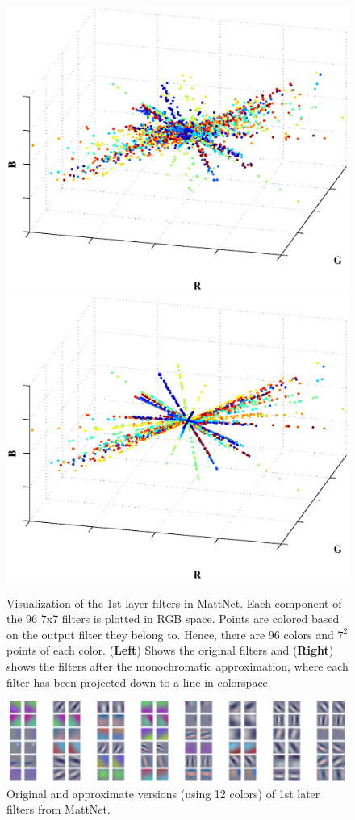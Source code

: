 \begin{figure}[t]
\centering
\begin{minipage}{0.75\textwidth}
	\includegraphics[width=0.5\linewidth]{img/RGB_components_matthew_3d.eps}
	\quad\quad
	\includegraphics[width=0.5\linewidth]{img/monochromatic_RGB_components_matthew_3d.eps} 
\end{minipage}
\vspace{-3mm}
\label{fig:RGB_components}
\caption{Visualization of the 1st layer filters in MattNet. Each component of the 96 7x7 filters is plotted in RGB space. Points are colored based on the output filter they belong to. Hence, there are 96 colors and $7^2$ points of each color. ({\bf Left}) Shows the
  original filters and ({\bf Right}) shows the filters after the monochromatic approximation, where each filter has been projected down to a line in colorspace.}
\end{figure}



\begin{figure}[t]
\begin{center}
      \includegraphics[width=0.9\linewidth]{img/denoising_combined.pdf}
\end{center}
\label{fig:denoising}
\vspace{-6mm}
\caption{Original and approximate versions (using 12 colors) of 1st later filters from MattNet.}
\end{figure}

